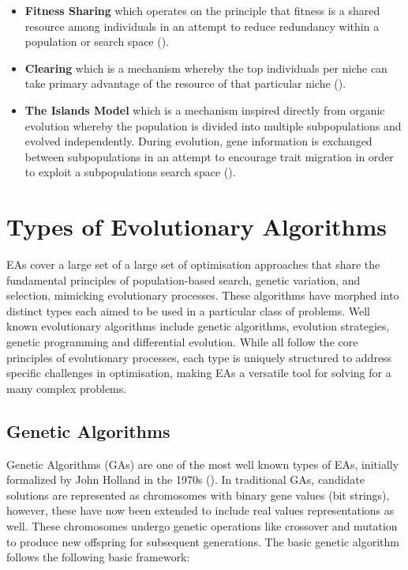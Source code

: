 \begin{itemize}
	\begin{itemize}
		\item \textbf{Fitness Sharing} which operates on the principle that fitness is a shared resource among individuals in an attempt to reduce redundancy within a population or search space (\cite{back2012handbook}).
		\item \textbf{Clearing} which is a mechanism whereby the top individuals per niche can take primary advantage of the resource of that particular niche (\cite{back2012handbook}).
		\item \textbf{The Islands Model} which is a mechanism inspired directly from organic evolution whereby the population is divided into multiple subpopulations and evolved independently. During evolution, gene information is exchanged between subpopulations in an attempt to encourage trait migration in order to exploit a subpopulations search space (\cite{back2012handbook}).
	\end{itemize}
\end{itemize}


\section{Types of Evolutionary Algorithms}\label{sec:ea_types_of_ea}
EAs cover a large set of a large set of optimisation approaches that share the fundamental principles of population-based search, genetic variation, and selection, mimicking evolutionary processes. These algorithms have morphed into distinct types each aimed to be used in a particular class of problems. Well known evolutionary algorithms include genetic algorithms, evolution strategies, genetic programming and differential evolution. While all follow the core principles of evolutionary processes, each type is uniquely structured to address specific challenges in optimisation, making EAs a versatile tool for solving for a many complex problems.\bigskip

\subsection{Genetic Algorithms}\label{sec:genetic_algorithms}
Genetic Algorithms (GAs) are one of the most well known types of EAs, initially formalized by John Holland in the 1970s (\cite{mitchell1998introduction}). In traditional GAs, candidate solutions are represented as chromosomes with binary gene values (bit strings), however, these have now been extended to include real values representations as well. These chromosomes undergo genetic operations like crossover and mutation to produce new offspring for subsequent generations. The basic genetic algorithm follows the following basic framework:


